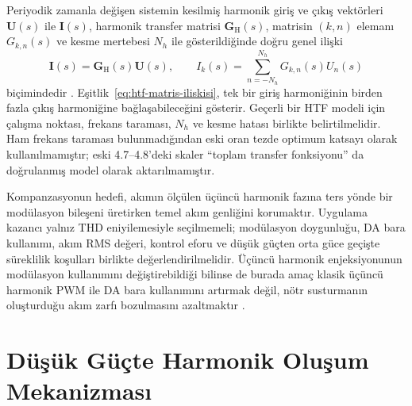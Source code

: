 Periyodik zamanla değişen sistemin kesilmiş harmonik giriş ve çıkış vektörleri $\mathbf{U}(s)$ ile $\mathbf{I}(s)$, harmonik transfer matrisi $\mathbf{G}_{\mathrm{H}}(s)$, matrisin $(k,n)$ elemanı $G_{k,n}(s)$ ve kesme mertebesi $N_h$ ile gösterildiğinde doğru genel ilişki
\begin{equation}
  \mathbf{I}(s)=\mathbf{G}_{\mathrm{H}}(s)\mathbf{U}(s),
  \qquad
  I_k(s)=\sum_{n=-N_h}^{N_h}G_{k,n}(s)U_n(s)
  \label{eq:htf-matris-iliskisi}
\end{equation}
biçimindedir \citep{Wereley1991,Liao2022}. Eşitlik~\eqref{eq:htf-matris-iliskisi}, tek bir giriş harmoniğinin birden fazla çıkış harmoniğine bağlaşabileceğini gösterir. Geçerli bir HTF modeli için çalışma noktası, frekans taraması, $N_h$ ve kesme hatası birlikte belirtilmelidir. Ham frekans taraması bulunmadığından eski oran tezde optimum katsayı olarak kullanılmamıştır; eski 4.7--4.8'deki skaler ``toplam transfer fonksiyonu'' da doğrulanmış model olarak aktarılmamıştır.

Kompanzasyonun hedefi, akımın ölçülen üçüncü harmonik fazına ters yönde bir modülasyon bileşeni üretirken temel akım genliğini korumaktır. Uygulama kazancı yalnız THD eniyilemesiyle seçilmemeli; modülasyon doygunluğu, DA bara kullanımı, akım RMS değeri, kontrol eforu ve düşük güçten orta güce geçişte süreklilik koşulları birlikte değerlendirilmelidir. Üçüncü harmonik enjeksiyonunun modülasyon kullanımını değiştirebildiği bilinse de burada amaç klasik üçüncü harmonik PWM ile DA bara kullanımını artırmak değil, nötr susturmanın oluşturduğu akım zarfı bozulmasını azaltmaktır \citep{Holmes2003}.


\section{Düşük Güçte Harmonik Oluşum Mekanizması}


